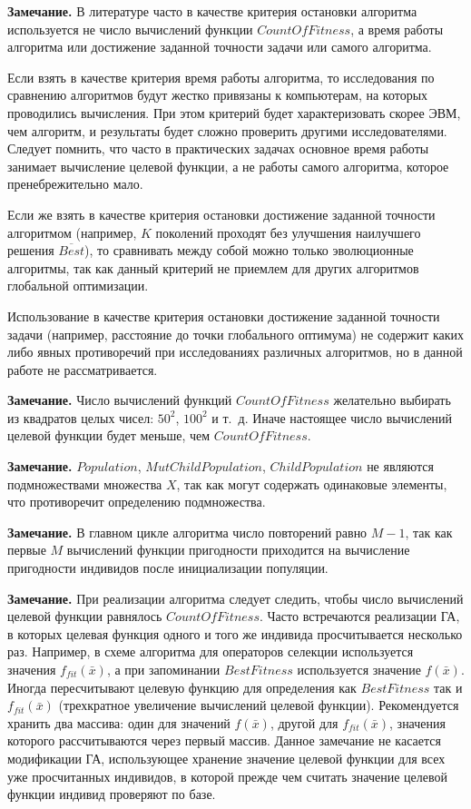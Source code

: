 \textbf{Замечание.} В литературе часто в качестве критерия остановки алгоритма используется не число вычислений функции $ CountOfFitness $, а время работы алгоритма или достижение заданной точности задачи или самого алгоритма.

Если взять в качестве критерия время работы алгоритма, то исследования по сравнению алгоритмов будут жестко привязаны к компьютерам, на которых проводились вычисления. При этом критерий будет характеризовать скорее ЭВМ, чем алгоритм, и результаты будет сложно проверить другими исследователями. Следует помнить, что часто в практических задачах основное время работы занимает вычисление целевой функции, а не работы самого алгоритма, которое пренебрежительно мало.

Если же взять в качестве критерия остановки достижение заданной точности алгоритмом (например, $ K $ поколений проходят без улучшения наилучшего решения $ \overline{Best} $), то сравнивать между собой можно только эволюционные алгоритмы, так как данный критерий не приемлем для других алгоритмов глобальной оптимизации.

Использование в качестве критерия остановки достижение заданной точности задачи (например, расстояние до точки глобального оптимума) не содержит каких либо явных противоречий при исследованиях различных алгоритмов, но в данной работе не рассматривается.

\textbf{Замечание.} Число вычислений функций $ CountOfFitness $ желательно выбирать из квадратов целых чисел: $ 50^2 $, $ 100^2 $ и т.~д. Иначе настоящее число вычислений целевой функции будет меньше, чем $ CountOfFitness $.

\textbf{Замечание.} $ Population $, $ MutChildPopulation $, $ ChildPopulation $ не являются подмножествами множества $ X $, так как могут содержать одинаковые элементы, что противоречит определению подмножества.

\textbf{Замечание.} В главном цикле алгоритма число повторений равно $ M-1 $, так как первые $ M $ вычислений функции пригодности приходится на вычисление пригодности индивидов после инициализации популяции.

\textbf{Замечание.} При реализации алгоритма следует следить, чтобы число вычислений целевой функции равнялось $ CountOfFitness $. Часто встречаются реализации ГА, в которых целевая функция одного и того же индивида просчитывается несколько раз. Например, в схеме алгоритма для операторов селекции используется значения $ f_{fit} \left( \bar{x} \right)  $, а при запоминании $ BestFitness $ используется значение $ f\left( \bar{x} \right) $. Иногда пересчитывают целевую функцию для определения как $ BestFitness $  так и $ f_{fit} \left( \bar{x} \right)  $ (трехкратное увеличение вычислений целевой функции). Рекомендуется хранить два массива: один для значений $ f\left( \bar{x} \right) $, другой для $ f_{fit} \left( \bar{x} \right)  $, значения которого рассчитываются через первый массив. Данное замечание не касается модификации ГА, использующее хранение значение целевой функции для всех уже просчитанных индивидов, в которой прежде чем считать значение целевой функции индивид проверяют по базе.

